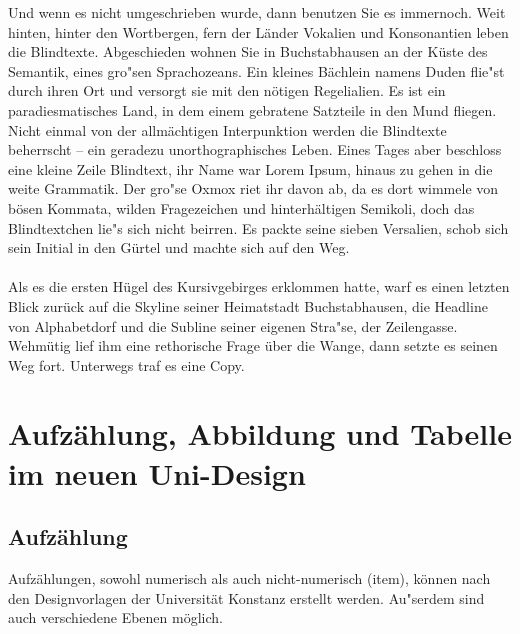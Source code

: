 Und wenn es nicht umgeschrieben wurde, dann benutzen Sie es immernoch. Weit hinten, hinter den Wortbergen, fern der Länder Vokalien und Konsonantien leben die Blindtexte. Abgeschieden wohnen Sie in Buchstabhausen an der Küste des Semantik, eines gro"sen Sprachozeans. Ein kleines Bächlein namens Duden flie"st durch ihren Ort und versorgt sie mit den nötigen Regelialien. Es ist ein paradiesmatisches Land, in dem einem gebratene Satzteile in den Mund fliegen. Nicht einmal von der allmächtigen Interpunktion werden die Blindtexte beherrscht – ein geradezu unorthographisches Leben. Eines Tages aber beschloss eine kleine Zeile Blindtext, ihr Name war Lorem Ipsum, hinaus zu gehen in die weite Grammatik. Der gro"se Oxmox riet ihr davon ab, da es dort wimmele von bösen Kommata, wilden Fragezeichen und hinterhältigen Semikoli, doch das Blindtextchen lie"s sich nicht beirren. Es packte seine sieben Versalien, schob sich sein Initial in den Gürtel und machte sich auf den Weg.\\
\\
Als es die ersten Hügel des Kursivgebirges erklommen hatte, warf es einen letzten Blick zurück auf die Skyline seiner Heimatstadt Buchstabhausen, die Headline von Alphabetdorf und die Subline seiner eigenen Stra"se, der Zeilengasse. Wehmütig lief ihm eine rethorische Frage über die Wange, dann setzte es seinen Weg fort. Unterwegs traf es eine Copy.

\normalsize

\chapter{Aufzählung, Abbildung und Tabelle im neuen Uni-Design}




%
%
%
%

\section{Aufzählung}

Aufzählungen, sowohl numerisch als auch nicht-numerisch (item), können nach den Designvorlagen der Universität Konstanz erstellt werden. Au"serdem sind auch verschiedene Ebenen möglich.\\

